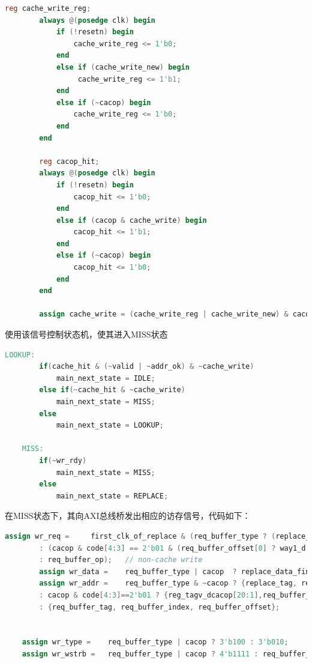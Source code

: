 \documentclass[11pt]{article}
\begin{document}
\begin{enumerate}
\begin{lstlisting}[language=verilog]
        reg cache_write_reg;
        always @(posedge clk) begin
            if (!resetn) begin
                cache_write_reg <= 1'b0;
            end
            else if (cache_write_new) begin
                 cache_write_reg <= 1'b1;
            end
            else if (~cacop) begin
                cache_write_reg <= 1'b0;
            end
        end
    
        reg cacop_hit;
        always @(posedge clk) begin
            if (!resetn) begin
                cacop_hit <= 1'b0;
            end
            else if (cacop & cache_write) begin
                cacop_hit <= 1'b1;
            end
            else if (~cacop) begin
                cacop_hit <= 1'b0;
            end
        end
    
        assign cache_write = (cache_write_reg | cache_write_new) & cacop & (code[4:3] == 2'b01 | code[4:3] == 2'b10 & (cacop_hit | cache_hit));    
    \end{lstlisting}
    
    使用该信号控制状态机，使其进入MISS状态
    \begin{lstlisting}[language=verilog]
        LOOKUP:
        if(cache_hit & (~valid | ~addr_ok) & ~cache_write)
            main_next_state = IDLE;
        else if(~cache_hit & ~cache_write)
            main_next_state = MISS;
        else
            main_next_state = LOOKUP;

    MISS:
        if(~wr_rdy)
            main_next_state = MISS;
        else
            main_next_state = REPLACE;
    \end{lstlisting}

    在MISS状态下，其向AXI总线桥发出相应的访存信号，代码如下：
    \begin{lstlisting}[language=verilog]
        assign wr_req =     first_clk_of_replace & (req_buffer_type ? (replace_d & replace_v)
        : (cacop & code[4:3] == 2'b01 & (req_buffer_offset[0] ? way1_d:way0_d) & reg_tagv_dcacop[0] |cacop & code[4:3] == 2'b10 & cache_write) ? 1
        : req_buffer_op);   // non-cache write
        assign wr_data =    req_buffer_type | cacop  ? replace_data_final : {4{req_buffer_wdata}};
        assign wr_addr =    req_buffer_type & ~cacop ? {replace_tag, req_buffer_index, 4'b0} 
        : cacop & code[4:3]==2'b01 ? {reg_tagv_dcacop[20:1],req_buffer_index,req_buffer_offset[3:1],1'b0}
        : {req_buffer_tag, req_buffer_index, req_buffer_offset};


    assign wr_type =    req_buffer_type | cacop ? 3'b100 : 3'b010;
    assign wr_wstrb =   req_buffer_type | cacop ? 4'b1111 : req_buffer_wstrb;
    \end{lstlisting}


\end{enumerate}
\end{document}
